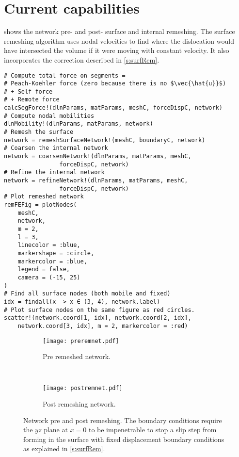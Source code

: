 \section{Current capabilities}

 shows the network pre- and post- surface and internal remeshing. The surface remeshing algorithm uses nodal velocities to find where the dislocation would have intersected the volume if it were moving with constant velocity. It also incorporates the correction described in \cref{s:surfRem}.
\begin{verbatim}
# Compute total force on segments = 
# Peach-Koehler force (zero because there is no $\vec{\hat{u}}$)
# + Self force
# + Remote force
calcSegForce!(dlnParams, matParams, meshC, forceDispC, network)
# Compute nodal mobilities
dlnMobility!(dlnParams, matParams, network)
# Remesh the surface
network = remeshSurfaceNetwork!(meshC, boundaryC, network)
# Coarsen the internal network
network = coarsenNetwork!(dlnParams, matParams, meshC, 
                forceDispC, network)
# Refine the internal network
network = refineNetwork!(dlnParams, matParams, meshC, 
                forceDispC, network)
# Plot remeshed network
remFEFig = plotNodes(
    meshC,
    network,
    m = 2,
    l = 3,
    linecolor = :blue,
    markershape = :circle,
    markercolor = :blue,
    legend = false,
    camera = (-15, 25)
)
# Find all surface nodes (both mobile and fixed)
idx = findall(x -> x ∈ (3, 4), network.label)
# Plot surface nodes on the same figure as red circles.
scatter!(network.coord[1, idx], network.coord[2, idx], 
    network.coord[3, idx], m = 2, markercolor = :red)
\end{verbatim}
\begin{figure}
    \centering
    \begin{subfigure}[t]{0.48\linewidth}
        \centering
        \texttt{[image: preremnet.pdf]}
        \caption{Pre remeshed network.}
    \end{subfigure}
    ~
    \begin{subfigure}[t]{0.48\linewidth}
        \centering
        \texttt{[image: postremnet.pdf]}
        \caption{Post remeshing network.}
    \end{subfigure}
    \caption[Network pre and post remeshing.]{Network pre and post remeshing. The boundary conditions require the $yz$ plane at $x=0$ to be impenetrable to stop a slip step from forming in the surface with fixed displacement boundary conditions as explained in \cref{s:surfRem}.}
    \label{f:networkPrePost}
\end{figure}
